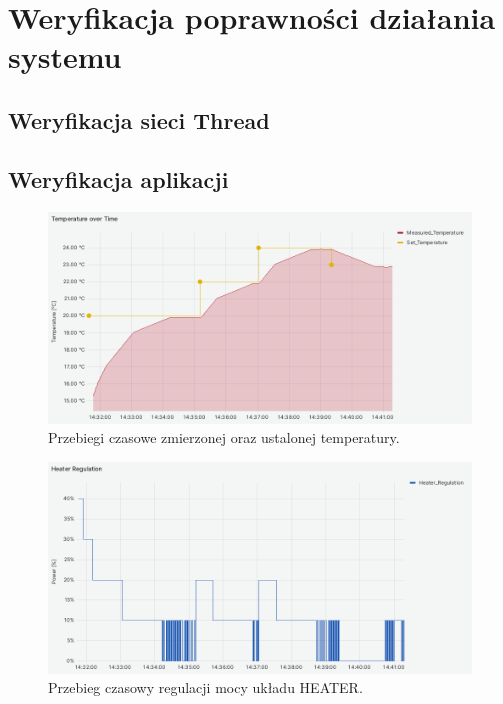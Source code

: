 \chapter{Weryfikacja poprawności działania systemu}

\section{Weryfikacja sieci Thread}

\section{Weryfikacja aplikacji}

    \begin{figure}[H]
        \centering
        \includegraphics[width=0.8\linewidth]{graphics/grafana/temperature-lm.png}
        \caption{Przebiegi czasowe zmierzonej oraz ustalonej temperatury.}
        \label{fig:graph-heater-temperature}
    \end{figure}

    \begin{figure}[H]
        \centering
        \includegraphics[width=0.8\linewidth]{graphics/grafana/heater-regulation-lm.png}
        \caption{Przebieg czasowy regulacji mocy układu HEATER.}
        \label{fig:graph-heater-regulation}
    \end{figure}

